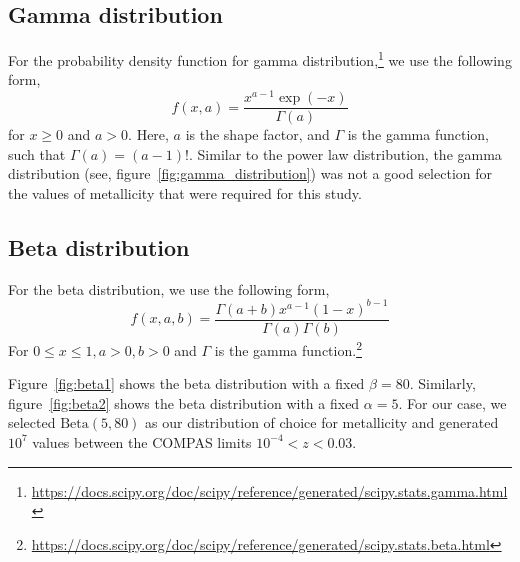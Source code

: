 \subsection{Gamma distribution}
\label{subsec:gamma-distribution}
For the probability density function for gamma distribution,\footnote{\url{https://docs.scipy.org/doc/scipy/reference/generated/scipy.stats.gamma.html}} we use the following form,
\begin{equation}
    f(x, a) = \frac{x^{a-1}\exp(-x)}{\Gamma(a)}
    \label{eq:gamma_distribution}
\end{equation}
for $x\geq 0$ and $a > 0$.
Here, $a$ is the shape factor, and $\Gamma$ is the gamma function, such that $\Gamma(a) = (a-1)!$.
Similar to the power law distribution, the gamma distribution (see, figure~\ref{fig:gamma_distribution}) was not a good selection for the values of metallicity that were required for this study.

\subsection{Beta distribution}
\label{subsec:beta-distribution}

For the beta distribution, we use the following form,
\begin{equation}
    f(x, a, b) = \frac{\Gamma(a+b)x^{a-1}(1-x)^{b-1}}{\Gamma(a)\Gamma(b)}
    \label{eq:beta_distribution}
\end{equation}
For $0 \leq x \leq 1, a > 0, b > 0$ and $\Gamma$ is the gamma function.\footnote{\url{https://docs.scipy.org/doc/scipy/reference/generated/scipy.stats.beta.html}}

Figure~\ref{fig:beta1} shows the beta distribution with a fixed $\beta=80$.
Similarly, figure~\ref{fig:beta2} shows the beta distribution with a fixed $\alpha=5$.
For our case, we selected $\text{Beta}(5, 80)$ as our distribution of choice for metallicity and generated $10^7$ values between the COMPAS limits $10^{-4} < z < 0.03$.


